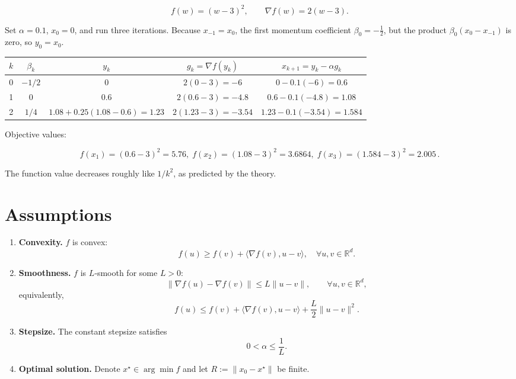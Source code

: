 \documentclass{article}
\newcommand{\grad}{\nabla}
\newcommand{\R}{\mathbb{R}}
\begin{document}
\[
f(w) = (w-3)^2,\qquad \grad f(w)=2(w-3).
\]

Set $\alpha=0.1$, $x_0=0$, and run three iterations.
Because $x_{-1}=x_0$, the first momentum coefficient $\beta_0= -\tfrac12$,
but the product $\beta_0(x_0-x_{-1})$ is zero, so $y_0=x_0$.

\begin{center}
\begin{tabular}{c|c|c|c|c}
$k$ & $\beta_k$ & $y_k$ & $g_k=\grad f(y_k)$ & $x_{k+1}=y_k-\alpha g_k$ \\ \hline
0 & $-1/2$ & $0$ & $2(0-3)=-6$ & $0-0.1(-6)=0.6$ \\[4pt]
1 & $0$    & $0.6$ & $2(0.6-3)=-4.8$ & $0.6-0.1(-4.8)=1.08$ \\[4pt]
2 & $1/4$  & $1.08+0.25(1.08-0.6)=1.23$ &
$2(1.23-3)=-3.54$ &
$1.23-0.1(-3.54)=1.584$ 
\end{tabular}
\end{center}

Objective values:

\[
f(x_1)= (0.6-3)^2=5.76,\;
f(x_2)= (1.08-3)^2=3.6864,\;
f(x_3)= (1.584-3)^2=2.005\, .
\]

The function value decreases roughly like $1/k^{2}$, as predicted by
the theory.

\section*{Assumptions}
\begin{enumerate}
\item \textbf{Convexity.} $f$ is convex:
\[
f(u)\ge f(v)+\langle\grad f(v),u-v\rangle,\quad\forall u,v\in\R^d .
\tag{A1}
\]

\item \textbf{Smoothness.} $f$ is $L$‑smooth for some $L>0$:
\[
\|\grad f(u)-\grad f(v)\|\le L\|u-v\|,\qquad\forall u,v\in\R^d,
\tag{A2}
\]
equivalently,
\[
f(u)\le f(v)+\langle\grad f(v),u-v\rangle+\frac{L}{2}\|u-v\|^{2}.
\tag{A2'}
\]

\item \textbf{Stepsize.} The constant stepsize satisfies 
\[
0<\alpha\le\frac{1}{L}.
\tag{A3}
\]

\item \textbf{Optimal solution.} Denote $x^\star\in\arg\min f$ and let
$R:=\|x_0-x^\star\|$ be finite.
\end{enumerate}

\end{document}
